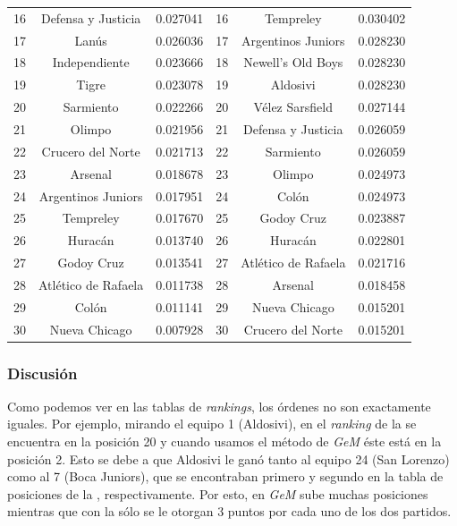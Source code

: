 \begin{center}
\begin{tabular}{|c|c|c||c|c|c|}
                        16 & Defensa y Justicia & 0.027041      & 16 & Tempreley & 0.030402 \\
                        17 & Lanús & 0.026036                   & 17 & Argentinos Juniors & 0.028230 \\
                        18 & Independiente & 0.023666           & 18 & Newell's Old Boys & 0.028230 \\
                        19 & Tigre & 0.023078                   & 19 & Aldosivi & 0.028230 \\
                        20 & Sarmiento & 0.022266               & 20 & Vélez Sarsfield & 0.027144 \\
                        21 & Olimpo & 0.021956                  & 21 & Defensa y Justicia & 0.026059 \\
                        22 & Crucero del Norte & 0.021713       & 22 & Sarmiento & 0.026059 \\
                        23 & Arsenal & 0.018678                 & 23 & Olimpo & 0.024973 \\
                        24 & Argentinos Juniors & 0.017951      & 24 & Colón & 0.024973 \\
                        25 & Tempreley & 0.017670               & 25 & Godoy Cruz & 0.023887 \\
                        26 & Huracán & 0.013740                 & 26 & Huracán & 0.022801 \\
                        27 & Godoy Cruz & 0.013541              & 27 & Atlético de Rafaela & 0.021716 \\
                        28 & Atlético de Rafaela & 0.011738     & 28 & Arsenal & 0.018458 \\
                        29 & Colón & 0.011141                   & 29 & Nueva Chicago & 0.015201 \\
                        30 & Nueva Chicago & 0.007928           & 30 & Crucero del Norte & 0.015201 \\
                        \hline
                    \end{tabular}
                \end{center}

            \subsubsection*{Discusión}

            Como podemos ver en las tablas de \emph{rankings}, los órdenes no son exactamente iguales. Por ejemplo, mirando el equipo 1 (Aldosivi), en el \emph{ranking} de la  se encuentra en la posición 20 y cuando usamos el método de \emph{GeM} éste está en la posición 2. Esto se debe a que Aldosivi le ganó tanto al equipo 24 (San Lorenzo) como al 7 (Boca Juniors), que se encontraban primero y segundo en la tabla de posiciones de la , respectivamente. Por esto, en \emph{GeM} sube muchas posiciones mientras que con la  sólo se le otorgan 3 puntos por cada uno de los dos partidos.

